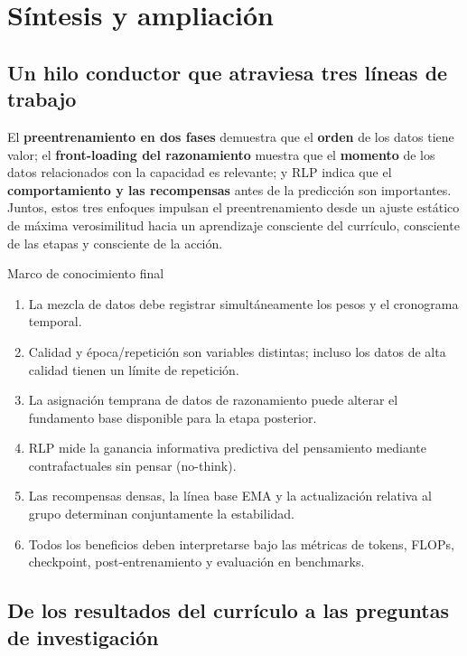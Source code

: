 \section{Síntesis y ampliación}

\subsection{Un hilo conductor que atraviesa tres líneas de trabajo}

El \textbf{preentrenamiento en dos fases} demuestra que el \textbf{orden} de los datos tiene valor; el \textbf{front-loading del razonamiento} muestra que el \textbf{momento} de los datos relacionados con la capacidad es relevante; y RLP indica que el \textbf{comportamiento y las recompensas} antes de la predicción son importantes. Juntos, estos tres enfoques impulsan el preentrenamiento desde un ajuste estático de máxima verosimilitud hacia un aprendizaje consciente del currículo, consciente de las etapas y consciente de la acción.

\begin{importantbox}{Marco de conocimiento final}
\begin{enumerate}
  \item La mezcla de datos debe registrar simultáneamente los pesos y el cronograma temporal.
  \item Calidad y época/repetición son variables distintas; incluso los datos de alta calidad tienen un límite de repetición.
  \item La asignación temprana de datos de razonamiento puede alterar el fundamento base disponible para la etapa posterior.
  \item RLP mide la ganancia informativa predictiva del pensamiento mediante contrafactuales sin pensar (no-think).
  \item Las recompensas densas, la línea base EMA y la actualización relativa al grupo determinan conjuntamente la estabilidad.
  \item Todos los beneficios deben interpretarse bajo las métricas de tokens, FLOPs, checkpoint, post-entrenamiento y evaluación en benchmarks.
\end{enumerate}
\end{importantbox}

\subsection{De los resultados del currículo a las preguntas de investigación}


